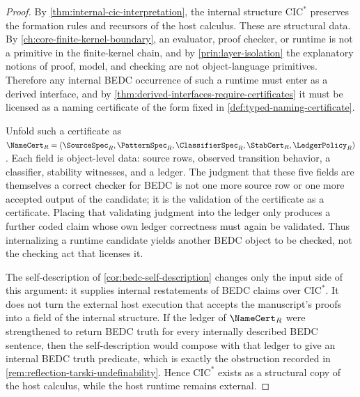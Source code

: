 \begin{proof}
By \autoref{thm:internal-cic-interpretation}, the internal structure $\mathrm{CIC}^{*}$ preserves the formation rules and recursors of the host calculus. These are structural data. By \autoref{ch:core-finite-kernel-boundary}, an evaluator, proof checker, or runtime is not a primitive in the finite-kernel chain, and by \autoref{prin:layer-isolation} the explanatory notions of proof, model, and checking are not object-language primitives. Therefore any internal BEDC occurrence of such a runtime must enter as a derived interface, and by \autoref{thm:derived-interfaces-require-certificates} it must be licensed as a naming certificate of the form fixed in \autoref{def:typed-naming-certificate}.

Unfold such a certificate as $\NameCert_R=(\SourceSpec_R,\PatternSpec_R,\ClassifierSpec_R,\StabCert_R,\LedgerPolicy_R)$. Each field is object-level data: source rows, observed transition behavior, a classifier, stability witnesses, and a ledger. The judgment that these five fields are themselves a correct checker for BEDC is not one more source row or one more accepted output of the candidate; it is the validation of the certificate as a certificate. Placing that validating judgment into the ledger only produces a further coded claim whose own ledger correctness must again be validated. Thus internalizing a runtime candidate yields another BEDC object to be checked, not the checking act that licenses it.

The self-description of \autoref{cor:bedc-self-description} changes only the input side of this argument: it supplies internal restatements of BEDC claims over $\mathrm{CIC}^{*}$. It does not turn the external host execution that accepts the manuscript's proofs into a field of the internal structure. If the ledger of $\NameCert_R$ were strengthened to return BEDC truth for every internally described BEDC sentence, then the self-description would compose with that ledger to give an internal BEDC truth predicate, which is exactly the obstruction recorded in \autoref{rem:reflection-tarski-undefinability}. Hence $\mathrm{CIC}^{*}$ exists as a structural copy of the host calculus, while the host runtime remains external.
\end{proof}

